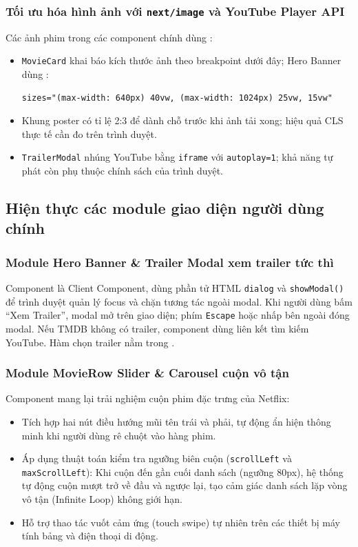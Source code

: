 \documentclass[12pt,a4paper]{extarticle}
\begin{document}
\subsubsection{Tối ưu hóa hình ảnh với \texttt{next/image} và YouTube Player API}
Các ảnh phim trong các component chính dùng :
\begin{itemize}[noitemsep]
    \item \texttt{MovieCard} khai báo kích thước ảnh theo breakpoint dưới đây; Hero Banner dùng :
\begin{lstlisting}[language={},numbers=none]
sizes="(max-width: 640px) 40vw, (max-width: 1024px) 25vw, 15vw"
\end{lstlisting}
    \item Khung poster có tỉ lệ 2:3 để dành chỗ trước khi ảnh tải xong; hiệu quả CLS thực tế cần đo trên trình duyệt.
    \item \texttt{TrailerModal} nhúng YouTube bằng \texttt{iframe} với \texttt{autoplay=1}; khả năng tự phát còn phụ thuộc chính sách của trình duyệt.
\end{itemize}

\subsection{Hiện thực các module giao diện người dùng chính}

\subsubsection{Module Hero Banner \& Trailer Modal xem trailer tức thì}
Component  là Client Component, dùng phần tử HTML \texttt{dialog} và \texttt{showModal()} để trình duyệt quản lý focus và chặn tương tác ngoài modal. Khi người dùng bấm ``Xem Trailer'', modal mở trên giao diện; phím \texttt{Escape} hoặc nhấp bên ngoài đóng modal. Nếu TMDB không có trailer, component dùng liên kết tìm kiếm YouTube. Hàm chọn trailer nằm trong .

\subsubsection{Module MovieRow Slider \& Carousel cuộn vô tận}
Component  mang lại trải nghiệm cuộn phim đặc trưng của Netflix:
\begin{itemize}[noitemsep]
    \item Tích hợp hai nút điều hướng mũi tên trái và phải, tự động ẩn hiện thông minh khi người dùng rê chuột vào hàng phim.
    \item Áp dụng thuật toán kiểm tra ngưỡng biên cuộn (\texttt{scrollLeft} và \texttt{maxScrollLeft}): Khi cuộn đến gần cuối danh sách (ngưỡng 80px), hệ thống tự động cuộn mượt trở về đầu và ngược lại, tạo cảm giác danh sách lặp vòng vô tận (Infinite Loop) không giới hạn.
    \item Hỗ trợ thao tác vuốt cảm ứng (touch swipe) tự nhiên trên các thiết bị máy tính bảng và điện thoại di động.
\end{itemize}
\end{document}
